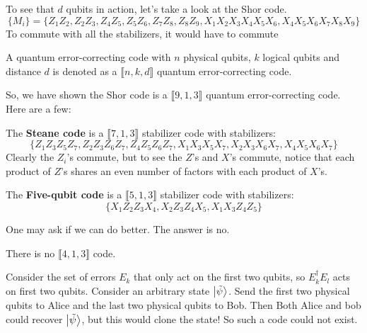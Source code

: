 \begin{example}
    To see that $d$ qubits in action, let's take a look at the Shor code.
    \[ \{M_i\} = \{ Z_1 Z_2, Z_2 Z_3, Z_4 Z_5, Z_5 Z_6, Z_7 Z_8, Z_8 Z_9, X_1 X_2 X_3 X_4 X_5 X_6, X_4 X_5 X_6 X_7 X_8 X_9 \}\]
    To commute with all the stabilizers, it would have to commute
\end{example}

\begin{definition}
    A quantum error-correcting code with $n$ physical qubits, $k$ logical qubits and distance $d$ is denoted as a
    $\llbracket n, k, d \rrbracket$ quantum error-correcting code.
\end{definition}

So, we have shown the Shor code is a $\llbracket 9, 1, 3 \rrbracket$ quantum error-correcting code. Here are a few:
\begin{example}
    The \textbf{Steane code} is a $\llbracket 7, 1, 3 \rrbracket$ stabilizer code with stabilizers:
    \[ \{ Z_1 Z_3 Z_5 Z_7, Z_2 Z_3 Z_6 Z_7, Z_4 Z_5 Z_6 Z_7, X_1 X_3 X_5 X_7, X_2 X_3 X_6 X_7, X_4 X_5 X_6 X_7  \} \]
    Clearly the $Z_i$'s commute, but to see the $Z$'s and $X$'s commute, notice that each product of $Z$'s shares an even number of factors with
    each product of $X$'s.

    The \textbf{Five-qubit code} is a $\llbracket 5, 1, 3 \rrbracket$ stabilizer code with stabilizers:
    \[ \{X_1 Z_2 Z_3 X_4, X_2 Z_3 Z_4 X_5, X_1 X_3 Z_4 Z_5 \} \]
\end{example}

One may ask if we can do better. The answer is no.
\begin{theorem}
    There is no $\llbracket 4, 1, 3 \rrbracket$ code.

    \begin{proof*}
        Consider the set of errors $E_k$ that only act on the first two qubits, so $E_k^{\dagger} E_l$ acts on first two qubits. Consider an arbitrary state $\ket{\tilde{\psi}}$.
        Send the first two physical qubits to Alice and the last two physical qubits to Bob. Then Both Alice and bob could recover $\ket{\tilde{\psi}}$,
        but this would clone the state! So such a code could not exist.
    \end{proof*}
\end{theorem}

